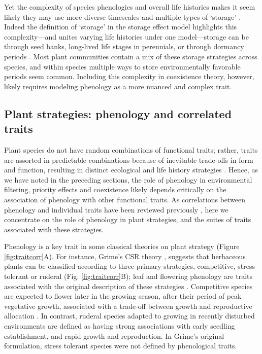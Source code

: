 \documentclass[11pt]{article}
\begin{document}
Yet the complexity of species phenologies and overall life histories makes it seem likely they may use more diverse timescales and multiple types of `storage' \citep[similar to the way chinstrap penguins get in a good night's sleep through thousands of daily micronaps,][]{libourel2023nesting}.  Indeed the definition of `storage' in the storage effect model highlights this complexity---and unites varying life histories under one model---storage can be through seed banks, long-lived life stages in perennials, or through dormancy periods \citep{Chesson:2000vd}. Most plant communities contain a mix of these storage strategies across species, and within species multiple ways to store environmentally favorable periods seem common. Including this complexity in coexistence theory, however, likely requires modeling phenology as a more nuanced and complex trait. 

\subsection*{Plant strategies: phenology and correlated traits} 

Plant species do not have random combinations of functional traits; rather, traits are assorted in predictable combinations because of inevitable trade-offs in form and function, resulting in distinct ecological and life history strategies \citep{stearns1998evolution,adler2014functional,westoby2002plant}. Hence, as we have noted in the preceding sections, the role of phenology in environmental filtering, priority effects and coexistence likely depends critically on the association of phenology with other functional traits. As correlations between phenology and individual traits have been reviewed previously \citep[e.g.][]{wolkovich2014aob,segrestin2020reproductive}, here we concentrate on the role of phenology in plant strategies, and the suites of traits associated with these strategies.

Phenology is a key trait in some classical theories on plant strategy (Figure \ref{fig:traitcorr}A). For instance, Grime's CSR theory \citep{grime1977evidence}, suggests that herbaceous plants can be classified according to three primary strategies, competitive, stress-tolerant or ruderal (Fig. \ref{fig:traitcorr}B); leaf and flowering phenology are traits associated with the original description of these strategies \citep[see Table 2 in][]{grime1977evidence}. Competitive species are expected to flower later in the growing season, after their period of peak vegetative growth,  associated with a trade-off between growth and reproductive allocation \citep{law1979cost}. In contrast, ruderal species adapted to growing in recently disturbed environments are defined as having strong associations with early seedling establishment, and rapid growth and reproduction. In Grime’s original formulation, stress tolerant species were not defined by phenological traits.
\end{document}
